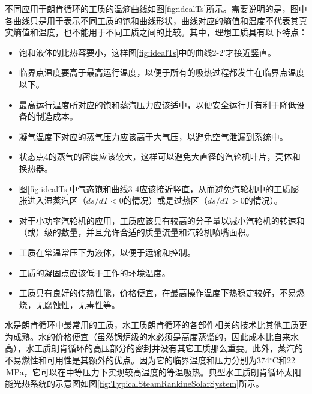 不同应用于朗肯循环的工质的温熵曲线如图\ref{fig:idealTs}所示。需要说明的是，图中各曲线只是用于表示不同工质的饱和曲线形状，曲线对应的熵值和温度不代表其真实熵值和温度，也不能用于不同工质之间的比较。其中，理想工质具有以下特点\cite{Abbin1977}：
\begin{itemize}

	\item 饱和液体的比热容要小，这样图\ref{fig:idealTs}中的曲线2-2'才接近竖直。
	\item 临界点温度要高于最高运行温度，以便于所有的吸热过程都发生在临界点温度以下。
	\item 最高运行温度所对应的饱和蒸汽压力应该适中，以便安全运行并有利于降低设备的制造成本。
	\item 凝气温度下对应的蒸气压力应该高于大气压，以避免空气泄漏到系统中。
	\item 状态点4的蒸气的密度应该较大，这样可以避免大直径的汽轮机叶片，壳体和换热器。
	\item 图\ref{fig:idealTs}中气态饱和曲线3-4应该接近竖直，从而避免汽轮机中的工质膨胀进入湿蒸汽区（$ds/dT < 0$的情况）或是过热区（$ds/dT > 0$的情况）。
	\item 对于小功率汽轮机的应用，工质应该具有较高的分子量以减小汽轮机的转速和（或）级的数量，并且允许合适的质量流量和汽轮机喷嘴面积。
	\item 工质在常温常压下为液体，以便于运输和控制。
	\item 工质的凝固点应该低于工作的环境温度。
	\item 工质具有良好的传热性能，价格便宜，在最高操作温度下热稳定较好，不易燃烧，无腐蚀性，无毒性等。
\end{itemize}

水是朗肯循环中最常用的工质，水工质朗肯循环的各部件相关的技术比其他工质更为成熟。水的价格便宜（虽然锅炉级的水必须是高度蒸馏的，因此成本比自来水高），水工质朗肯循环的高压部分的密封并没有其它工质那么重要。此外，蒸汽的不易燃性和可用性是其额外的优点。因为它的临界温度和压力分别为374$\mathrm{^\circ C}$和22$\,\mathrm{MPa}$，它可以在中等压力下实现较高温度的等温吸热。典型水工质朗肯循环太阳能光热系统的示意图如图\ref{fig:TypicalSteamRankineSolarSystem}所示。

